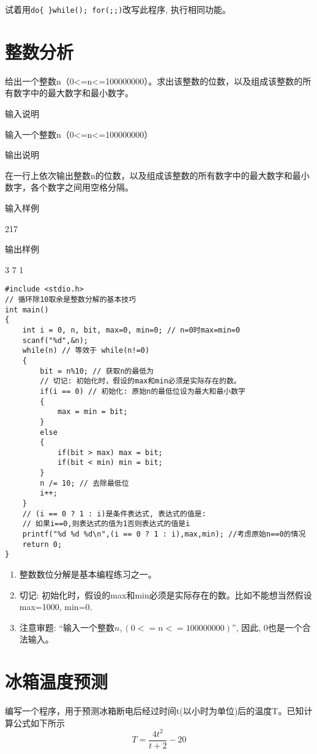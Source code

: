 \begin{note}
	试着用\lstinline|do{ }while(); for(;;)|改写此程序, 执行相同功能。
\end{note}

\section{整数分析}\label{integer}
给出一个整数n（0<=n<=100000000）。求出该整数的位数，以及组成该整数的所有数字中的最大数字和最小数字。

输入说明
	
输入一个整数n（0<=n<=100000000）

输出说明
	
在一行上依次输出整数n的位数，以及组成该整数的所有数字中的最大数字和最小数字，各个数字之间用空格分隔。

输入样例
	
217

输出样例
	
3 7 1

\begin{lstlisting}
#include <stdio.h>
// 循环除10取余是整数分解的基本技巧
int main()
{
	int i = 0, n, bit, max=0, min=0; // n=0时max=min=0
	scanf("%d",&n);
	while(n) // 等效于 while(n!=0)
	{
		bit = n%10; // 获取n的最低为
		// 切记: 初始化时，假设的max和min必须是实际存在的数。
		if(i == 0) // 初始化: 原始n的最低位设为最大和最小数字
		{
			max = min = bit;
		}  
		else
		{
			if(bit > max) max = bit;
			if(bit < min) min = bit;
		}
		n /= 10; // 去除最低位
		i++;
	} 
	// (i == 0 ? 1 : i)是条件表达式, 表达式的值是:
	// 如果i==0,则表达式的值为1否则表达式的值是i
	printf("%d %d %d\n",(i == 0 ? 1 : i),max,min); //考虑原始n==0的情况 
	return 0;
} 
\end{lstlisting}

\begin{note}[知识点]
  \begin{enumerate}
  	\item 整数数位分解是基本编程练习之一。
  	\item 切记: 初始化时，假设的max和min必须是实际存在的数。比如不能想当然假设max=1000, min=0.
  	\item 注意审题: ``输入一个整数$n,(0<=n<=100000000)$'', 因此, 0也是一个合法输入。
  \end{enumerate}
  
\end{note}

\section{冰箱温度预测}
编写一个程序，用于预测冰箱断电后经过时间t(以小时为单位)后的温度T。已知计算公式如下所示
\[ T=\frac{4t^2}{t+2}-20 \]

